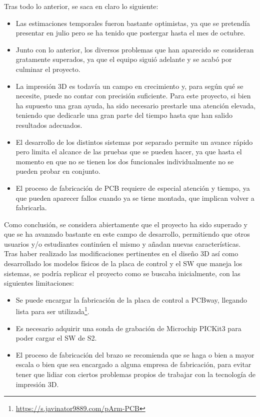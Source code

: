 Tras todo lo anterior, se saca en claro lo siguiente:
\begin{itemize}
    \item Las estimaciones temporales fueron bastante optimistas, ya que se pretendía
    presentar en julio pero se ha tenido que postergar hasta el mes de octubre.

    \item Junto con lo anterior, los diversos problemas que han aparecido se consideran
    gratamente superados, ya que el equipo siguió adelante y se acabó por culminar el
    proyecto.

    \item La impresión 3D es todavía un campo en crecimiento y, para según qué se
    necesite, puede no contar con precisión suficiente. Para este proyecto, si bien
    ha supuesto una gran ayuda, ha sido necesario prestarle una atención elevada,
    teniendo que dedicarle una gran parte del tiempo hasta que han salido resultados
    adecuados.

    \item El desarrollo de los distintos sistemas por separado permite un avance rápido
    pero limita el alcance de las pruebas que se pueden hacer, ya que hasta el momento en
    que no se tienen los dos funcionales individualmente no se pueden probar en conjunto.

    \item El proceso de fabricación de \ac{PCB} requiere de especial atención y tiempo,
    ya que pueden aparecer fallos cuando ya se tiene montada, que implican volver a
    fabricarla.
\end{itemize}

Como conclusión, se considera abiertamente que el proyecto  ha sido superado y que se ha avanzado
bastante en este campo de desarrollo, permitiendo que otros usuarios y/o estudiantes
continúen el mismo y añadan nuevas características. Tras haber realizado las
modificaciones pertinentes en el diseño 3D así como desarrollado los modelos físicos
de la placa de control y el \ac{SW} que maneja los sistemas, se podría replicar
el proyecto como se buscaba inicialmente, con las siguientes limitaciones:
\begin{itemize}
    \item Se puede encargar la fabricación de la placa de control a PCBway,
    llegando lista para ser utilizada\footnote{\url{https://s.javinator9889.com/pArm-PCB}
    \qquad {}}.

    \item Es necesario adquirir una sonda de grabación de Microchip PICKit3 para
    poder cargar el \ac{SW} de \ac{S2}.

    \item El proceso de fabricación del brazo se recomienda que se haga o bien a
    mayor escala o bien que sea encargado a alguna empresa de fabricación, para
    evitar tener que lidiar con ciertos problemas propios de trabajar con
    la tecnología de impresión 3D.
\end{itemize}

